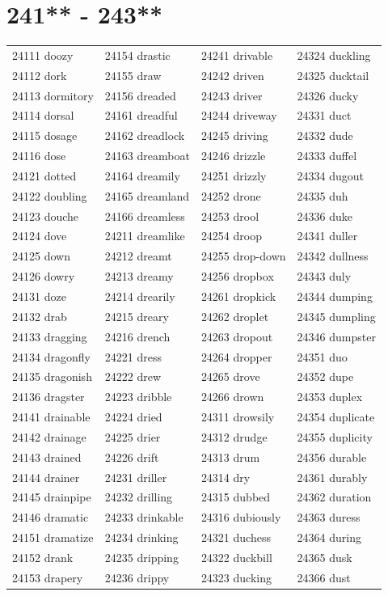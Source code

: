 \documentclass[10pt, oneside]{book}
\begin{document}
\begin{table}
	\centering
	\section*{241** - 243**}
	\begin{tabular}{l l l l}
24111 doozy &24154 drastic &24241 drivable &24324 duckling\\
24112 dork &24155 draw &24242 driven &24325 ducktail\\
24113 dormitory &24156 dreaded &24243 driver &24326 ducky\\
24114 dorsal &24161 dreadful &24244 driveway &24331 duct\\
24115 dosage &24162 dreadlock &24245 driving &24332 dude\\
24116 dose &24163 dreamboat &24246 drizzle &24333 duffel\\
24121 dotted &24164 dreamily &24251 drizzly &24334 dugout\\
24122 doubling &24165 dreamland &24252 drone &24335 duh\\
24123 douche &24166 dreamless &24253 drool &24336 duke\\
24124 dove &24211 dreamlike &24254 droop &24341 duller\\
24125 down &24212 dreamt &24255 drop-down &24342 dullness\\
24126 dowry &24213 dreamy &24256 dropbox &24343 duly\\
24131 doze &24214 drearily &24261 dropkick &24344 dumping\\
24132 drab &24215 dreary &24262 droplet &24345 dumpling\\
24133 dragging &24216 drench &24263 dropout &24346 dumpster\\
24134 dragonfly &24221 dress &24264 dropper &24351 duo\\
24135 dragonish &24222 drew &24265 drove &24352 dupe\\
24136 dragster &24223 dribble &24266 drown &24353 duplex\\
24141 drainable &24224 dried &24311 drowsily &24354 duplicate\\
24142 drainage &24225 drier &24312 drudge &24355 duplicity\\
24143 drained &24226 drift &24313 drum &24356 durable\\
24144 drainer &24231 driller &24314 dry &24361 durably\\
24145 drainpipe &24232 drilling &24315 dubbed &24362 duration\\
24146 dramatic &24233 drinkable &24316 dubiously &24363 duress\\
24151 dramatize &24234 drinking &24321 duchess &24364 during\\
24152 drank &24235 dripping &24322 duckbill &24365 dusk\\
24153 drapery &24236 drippy &24323 ducking &24366 dust\\
	\end{tabular}
 \end{table}
\clearpage
\end{document}
